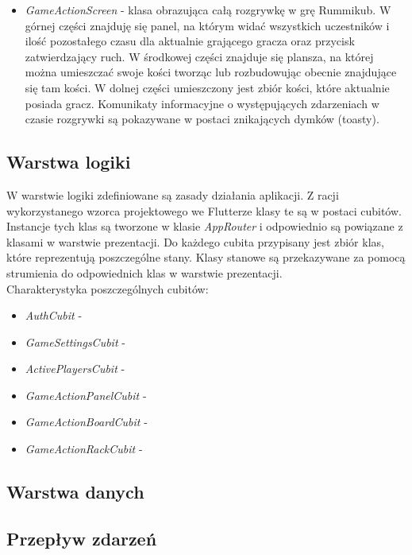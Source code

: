 \begin{itemize}
	\item \emph{GameActionScreen} - klasa obrazująca całą rozgrywkę w grę Rummikub. W górnej części znajduję się panel, na którym widać wszystkich uczestników i ilość pozostałego czasu dla aktualnie grającego gracza oraz przycisk zatwierdzający ruch. W środkowej części znajduje się plansza, na której można umieszczać swoje kości tworząc lub rozbudowując obecnie znajdujące się tam kości. W dolnej części umieszczony jest zbiór kości, które aktualnie posiada gracz. Komunikaty informacyjne o występujących zdarzeniach w czasie rozgrywki są pokazywane w postaci znikających dymków (toasty).
\end{itemize}

\subsection{Warstwa logiki}

W warstwie logiki zdefiniowane są zasady działania aplikacji. Z racji wykorzystanego wzorca projektowego we Flutterze klasy te są w postaci cubitów. Instancje tych klas są tworzone w klasie \emph{AppRouter} i odpowiednio są powiązane z klasami w warstwie prezentacji. Do każdego cubita przypisany jest zbiór klas, które reprezentują poszczególne stany. Klasy stanowe są przekazywane za pomocą strumienia do odpowiednich klas w warstwie prezentacji. \\

Charakterystyka poszczególnych cubitów:
\begin{itemize}
	\item \emph{AuthCubit} -
	\item \emph{GameSettingsCubit} -
	\item \emph{ActivePlayersCubit} -
	\item \emph{GameActionPanelCubit} -
	\item \emph{GameActionBoardCubit} -
	\item \emph{GameActionRackCubit} -
\end{itemize}

\subsection{Warstwa danych}

\subsection{Przepływ zdarzeń}


